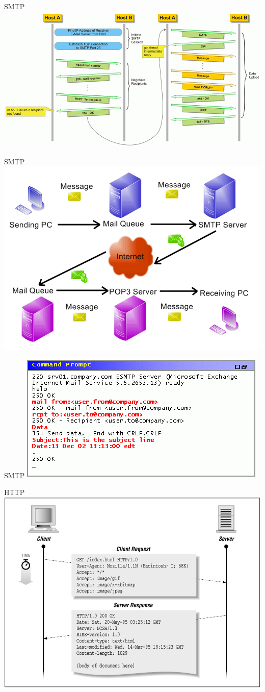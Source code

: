 \documentclass{beamer}
\begin{document}
\begin{frame}{SMTP}
    \includegraphics[width=0.7\linewidth]{smtp}
\end{frame}
\begin{frame}{SMTP}
    \includegraphics[width=0.7\linewidth]{smrp_queue}
\end{frame}
\begin{frame}{SMTP}
    \includegraphics[width=0.7\linewidth]{smtp_shell}
\end{frame}
\begin{frame}{HTTP}
    \includegraphics[width=0.7\linewidth]{http}
\end{frame}
\end{document}
